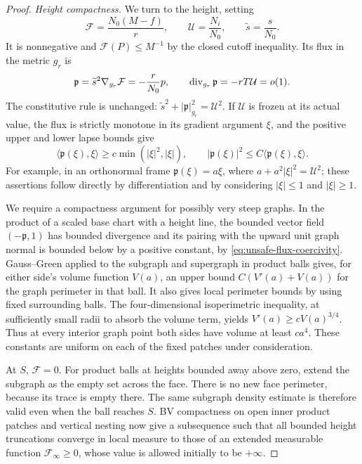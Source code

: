 \begin{proof}
\smallskip\noindent\emph{Height compactness.}
We turn to the height, setting
\begin{equation}
 \mathcal F=\frac{N_0(M-f)}{r},\qquad
 \mathcal U=\frac{N_i}{N_0},\qquad \widetilde s=\frac{s}{N_0}.
 \label{eq:unsafe-normalized-height}
\end{equation}
It is nonnegative and \(\mathcal F(P)\le M^{-1}\) by the closed
cutoff inequality.  Its flux in the metric \(g_r\) is
\begin{equation}
 \mathfrak p=\widetilde s^2\nabla_{g_r}\mathcal F
       =-\frac r{N_0}p,\qquad
 \operatorname{div}_{g_r}\mathfrak p=-rT\mathcal U=o(1).
 \label{eq:unsafe-height-equation}
\end{equation}
The constitutive rule is unchanged:
\(\widetilde s^2+|\mathfrak p|_{g_r}^2=\mathcal U^2\).
If \(\mathcal U\) is frozen at its actual value, the flux is
strictly monotone in its gradient argument \(\xi\), and the positive
upper and lower lapse bounds give
\begin{equation}
 \langle\mathfrak p(\xi),\xi\rangle
   \ge c\min(|\xi|^2,|\xi|),\qquad
 |\mathfrak p(\xi)|^2
   \le C\langle\mathfrak p(\xi),\xi\rangle.
 \label{eq:unsafe-flux-coercivity}
\end{equation}
For example, in an orthonormal frame
\(\mathfrak p(\xi)=a\xi\), where
\(a+a^2|\xi|^2=\mathcal U^2\); these assertions follow directly
by differentiation and by considering \(|\xi|\le1\) and
\(|\xi|\ge1\).

We require a compactness argument for possibly very steep graphs.
In the product of a scaled base chart with a height line, the bounded
vector field \((-\mathfrak p,1)\) has bounded divergence and its
pairing with the upward unit graph normal is bounded below by a
positive constant, by \eqref{eq:unsafe-flux-coercivity}.  Gauss--Green
applied to the subgraph and supergraph in product balls gives, for
either side's volume function \(V(a)\), an upper bound
\(C(V'(a)+V(a))\) for the graph perimeter in that ball.  It also
gives local perimeter bounds by using fixed surrounding balls.
The four-dimensional isoperimetric inequality, at sufficiently small
radii to absorb the volume term, yields
\(V'(a)\ge cV(a)^{3/4}\).  Thus at every interior graph point both
sides have volume at least \(ca^4\).  These constants are uniform
on each of the fixed patches under consideration.

At \(S\), \(\mathcal F=0\).  For product balls at heights bounded
away above zero, extend the subgraph as the empty set across the
face.  There is no new face perimeter, because its trace is empty
there.  The same subgraph density estimate is therefore valid even
when the ball reaches \(S\).  BV compactness on open inner product
patches and vertical nesting now give a subsequence such that all
bounded height truncations converge in local measure to those of an
extended measurable function \(\mathcal F_\infty\ge0\), whose
value is allowed initially to be \(+\infty\).


\end{proof}
